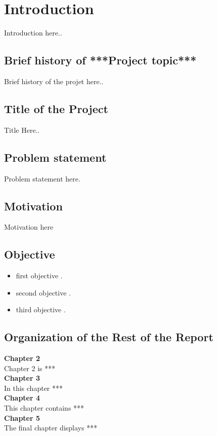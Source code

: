 \chapter{Introduction}
\label{Chapter 1}
Introduction here..
\section{Brief history of ***Project topic***}
Brief history of the projet here.. 
\section{Title of the Project}
Title Here..
\section{Problem statement}
Problem statement here. 
\section{Motivation}
Motivation here
\section{Objective}
\begin{itemize}
    \item first objective .
    \item second objective .
    \item third objective .
\end{itemize}
\section{Organization of the Rest of the Report}

{\bf Chapter 2} \\
Chapter 2 is ***
\\
{\bf Chapter 3} \\
In this chapter ***
\\
{\bf Chapter 4}\\
This chapter contains ***
\\
{\bf Chapter 5}\\
The final chapter displays ***






























